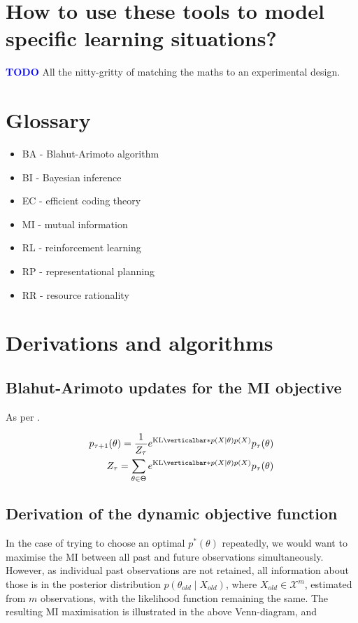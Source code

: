\documentclass{article}
\newcommand{\KL}[2]{\mathrm{KL} \verticalbar*{#1}{#2} }  %
\newcommand{\todo}{\textcolor{blue}{\textbf{TODO }}}
\begin{document}
\section{How to use these tools to model specific learning situations?}

\todo All the nitty-gritty of matching the maths to an experimental design.

\appendix

\section{Glossary}

\begin{itemize}
    \item BA - Blahut-Arimoto algorithm
    \item BI - Bayesian inference
    \item EC - efficient coding theory
    \item MI - mutual information
    \item RL - reinforcement learning 
    \item RP - representational planning
    \item RR - resource rationality
\end{itemize}

\section{Derivations and algorithms}

\subsection{Blahut-Arimoto updates for the MI objective} \label{sec:ba_mi}

As per \cite{mattingly2018}.

\begin{eqnarray}
    p_{\tau+1}(\theta) = \frac{1}{Z_\tau} e^{\KL{p(X \mid \theta)}{p(X)}} p_\tau(\theta) \\
    Z_\tau = \sum_{\theta \in \Theta} e^{\KL{p(X \mid \theta)}{p(X)}} p_\tau(\theta)
\end{eqnarray}

\subsection{Derivation of the dynamic objective function} \label{sec:dyn_obj}

In the case of trying to choose an optimal $p^*(\theta)$ repeatedly, we would want to maximise the MI between all past and future observations simultaneously. However, as individual past observations are not retained, all information about those is in the posterior distribution $p(\theta_{old} \mid X_{old})$, where $X_{old} \in \mathcal{X}^m$, estimated from $m$ observations, with the likelihood function remaining the same. The resulting MI maximisation is illustrated in the above Venn-diagram, and 
\end{document}
